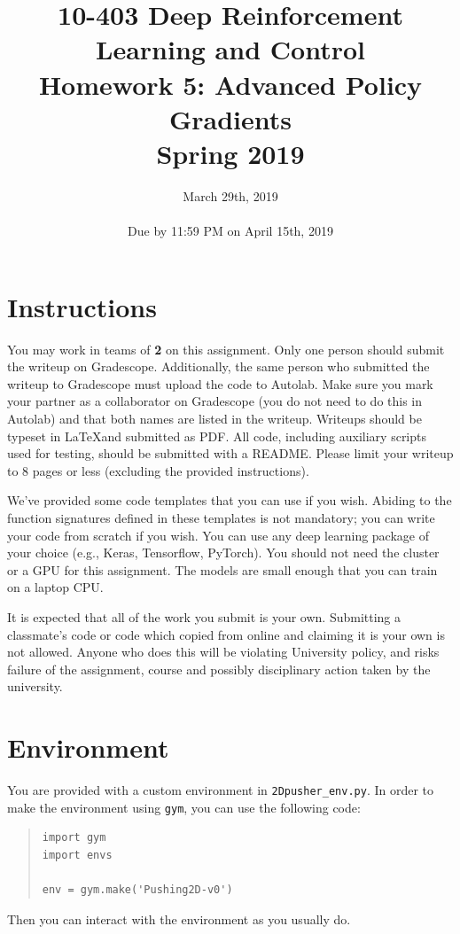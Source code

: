 \documentclass[12pt]{article}
\title{10-403 Deep Reinforcement Learning and Control\\
  Homework 5: Advanced Policy Gradients\\
  Spring 2019\\
}
\date{March 29th, 2019\\
  \hspace{1cm}\\
Due by 11:59 PM on April 15th, 2019}
\begin{document}
\maketitle
\noindent
\section*{Instructions}

You may work in teams of \textbf{2} on this assignment. Only one person should submit the writeup on Gradescope. Additionally, the same person who submitted the writeup to Gradescope must upload the code to Autolab.  Make sure you mark your partner as a collaborator on Gradescope (you do not need to do this in Autolab) and that both names are listed in the writeup.  Writeups should be typeset in \LaTeX and submitted as PDF. All code, including auxiliary scripts used for testing, should be submitted with a README.  Please limit your writeup to 8 pages or less (excluding the provided instructions).

We've provided some code templates that you can use if you wish. Abiding to the function signatures defined in these templates is not mandatory; you can write your code from scratch if you wish. You can use any deep learning package of your choice (e.g., Keras, Tensorflow, PyTorch). You should not need the cluster or a GPU for this assignment. The models are small enough that you can train on a laptop CPU.

It is expected that all of the work you submit is your own. Submitting a classmate's code or code which copied from online and claiming it is your own is not allowed. Anyone who does this will be violating University policy, and risks failure of the assignment, course and possibly disciplinary action taken by the university.

\section*{Environment}
You are provided with a custom environment in \texttt{2Dpusher\_env.py}.  In order to make the environment using \texttt{gym}, you can use the following code:
\begin{quote}
\begin{verbatim}
import gym
import envs

env = gym.make('Pushing2D-v0')
\end{verbatim}
\end{quote}
Then you can interact with the environment as you usually do.
\end{document}

